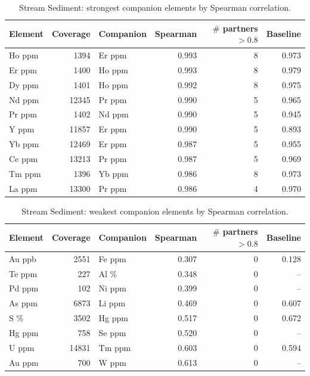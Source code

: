 
\begin{table}[H]
  \centering
  \caption{Stream Sediment: strongest companion elements by Spearman correlation.}
  \label{tab:ss-strongest-companions}
  \begin{tabular}{lrlrrr}
    \toprule
    Element & Coverage & Companion & Spearman & $\#$ partners $>0.8$ & Baseline \\
    \midrule
    Ho ppm & 1394  & Er ppm & 0.993 & 8 & 0.973 \\
    Er ppm & 1400  & Ho ppm & 0.993 & 8 & 0.979 \\
    Dy ppm & 1401  & Ho ppm & 0.992 & 8 & 0.975 \\
    Nd ppm & 12345 & Pr ppm & 0.990 & 5 & 0.965 \\
    Pr ppm & 1402  & Nd ppm & 0.990 & 5 & 0.945 \\
    Y ppm  & 11857 & Er ppm & 0.990 & 5 & 0.893 \\
    Yb ppm & 12469 & Er ppm & 0.987 & 5 & 0.955 \\
    Ce ppm & 13213 & Pr ppm & 0.987 & 5 & 0.969 \\
    Tm ppm & 1396  & Yb ppm & 0.986 & 8 & 0.973 \\
    La ppm & 13300 & Pr ppm & 0.986 & 4 & 0.970 \\
    \bottomrule
  \end{tabular}
\end{table}

\begin{table}[H]
  \centering
  \caption{Stream Sediment: weakest companion elements by Spearman correlation.}
  \label{tab:ss-weakest-companions}
  \begin{tabular}{lrlrrr}
    \toprule
    Element & Coverage & Companion & Spearman & $\#$ partners $>0.8$ & Baseline \\
    \midrule
    Au ppb & 2551  & Fe ppm & 0.307 & 0 & 0.128 \\
    Te ppm & 227   & Al \%  & 0.348 & 0 & --    \\
    Pd ppm & 102   & Ni ppm & 0.399 & 0 & --    \\
    As ppm & 6873  & Li ppm & 0.469 & 0 & 0.607 \\
    S \%   & 3502  & Hg ppm & 0.517 & 0 & 0.672 \\
    Hg ppm & 758   & Se ppm & 0.520 & 0 & --    \\
    U ppm  & 14831 & Tm ppm & 0.603 & 0 & 0.594 \\
    Au ppm & 700   & W ppm  & 0.613 & 0 & --    \\
    \bottomrule
  \end{tabular}
\end{table}